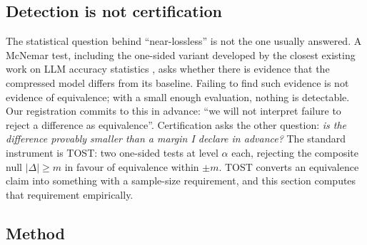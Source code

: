 \label{sec:certification}

\subsection{Detection is not certification}

The statistical question behind ``near-lossless'' is not the one usually
answered. A McNemar test, including the one-sided variant developed by the
closest existing work on LLM accuracy statistics
\citep{llmaccuracystats2026}, asks whether there is evidence that the
compressed model differs from its baseline. Failing to find such evidence is not
evidence of equivalence; with a small enough evaluation, nothing is detectable.
Our registration commits to this in advance: ``we will not interpret failure to
reject a difference as equivalence''.
Certification asks the other question: \emph{is the difference provably smaller
than a margin I declare in advance?} The standard instrument is TOST: two
one-sided tests at level $\alpha$ each, rejecting the composite null
$|\Delta| \geq m$ in favour of equivalence within $\pm m$. TOST converts an
equivalence claim into something with a sample-size requirement, and this
section computes that requirement empirically.

\subsection{Method}
\label{sec:cert:method}

